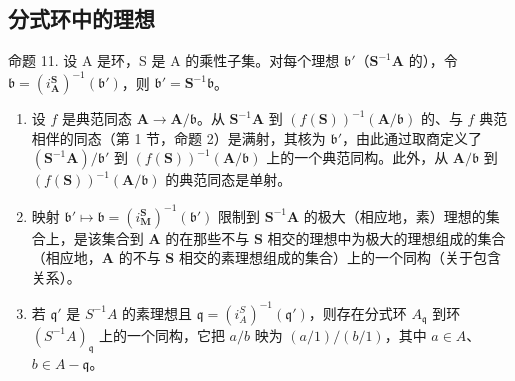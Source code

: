 \subsection{分式环中的理想}

命题 11. 设 A 是环，S 是 A 的乘性子集。对每个理想 \(\mathfrak{b}'\)（\(\mathbf{S}^{-1}\mathbf{A}\) 的），令 \(\mathfrak{b} = (i_{\mathbf{A}}^{\mathbf{S}})^{-1}(\mathfrak{b}')\)，则 \(\mathfrak{b}' = \mathbf{S}^{-1}\mathfrak{b}\)。

\begin{enumerate}
\def\labelenumi{(\roman{enumi})}
\item
  设 \(f\) 是典范同态 \(\mathbf{A} \to \mathbf{A} / \mathfrak{b}\)。从 \(\mathbf{S}^{-1}\mathbf{A}\) 到 \((f(\mathbf{S}))^{-1}(\mathbf{A} / \mathfrak{b})\) 的、与 \(f\) 典范相伴的同态（第 1 节，命题 2）是满射，其核为 \(\mathfrak{b}'\)，由此通过取商定义了 \((\mathbf{S}^{-1}\mathbf{A}) / \mathfrak{b}'\) 到 \((f(\mathbf{S}))^{-1}(\mathbf{A} / \mathfrak{b})\) 上的一个典范同构。此外，从 \(\mathbf{A} / \mathfrak{b}\) 到 \((f(\mathbf{S}))^{-1}(\mathbf{A} / \mathfrak{b})\) 的典范同态是单射。
\item
  映射 \(\mathfrak{b}' \mapsto \mathfrak{b} = (i_{\mathbf{M}}^{\mathbf{S}})^{-1}(\mathfrak{b}')\) 限制到 \(\mathbf{S}^{-1}\mathbf{A}\) 的极大（相应地，素）理想的集合上，是该集合到 \(\mathbf{A}\) 的在那些不与 \(\mathbf{S}\) 相交的理想中为极大的理想组成的集合（相应地，\(\mathbf{A}\) 的不与 \(\mathbf{S}\) 相交的素理想组成的集合）上的一个同构（关于包含关系）。
\item
  若 \(\mathfrak{q}'\) 是 \(S^{-1}A\) 的素理想且 \(\mathfrak{q} = (i_A^S)^{-1}(\mathfrak{q}')\)，则存在分式环 \(A_{\mathfrak{q}}\) 到环 \((S^{-1}A)_{\mathfrak{q}}\) 上的一个同构，它把 \(a/b\) 映为 \((a/1)/(b/1)\)，其中 \(a \in A\)、\(b \in A - \mathfrak{q}\)。

\end{enumerate}

